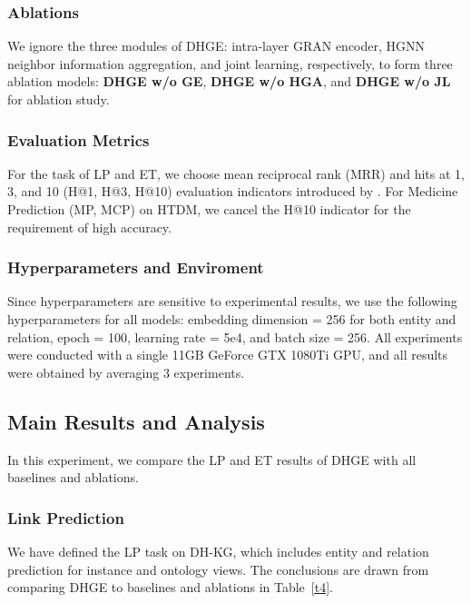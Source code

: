 \documentclass[letterpaper]{article} \usepackage{aaai23}  \usepackage{times}  \usepackage{helvet}  \usepackage{courier}  \usepackage[hyphens]{url}  \usepackage{graphicx} \urlstyle{rm} \def\UrlFont{\rm}  \usepackage{natbib}  \usepackage{caption} \frenchspacing  \setlength{\pdfpagewidth}{8.5in}  \setlength{\pdfpageheight}{11in}  \usepackage{times}
\begin{document}
\subsubsection{Ablations}
We ignore the three modules of DHGE: intra-layer GRAN encoder, HGNN neighbor information aggregation, and joint learning, respectively, to form three ablation models: \textbf{DHGE w/o GE}, \textbf{DHGE w/o HGA}, and  \textbf{DHGE w/o JL} for ablation study.

\subsubsection{Evaluation Metrics}
For the task of LP and ET, we choose mean reciprocal rank (MRR) and hits at 1, 3, and 10 (H@1, H@3, H@10) evaluation indicators introduced by \citet{TransE}. For Medicine Prediction (MP, MCP) on HTDM, we cancel the H@10 indicator for the requirement of high accuracy.

\subsubsection{Hyperparameters and Enviroment}
Since hyperparameters are sensitive to experimental results, we use the following hyperparameters for all models: embedding dimension = 256 for both entity and relation, epoch = 100, learning rate = 5e4, and batch size = 256. All experiments were conducted with a single 11GB GeForce GTX 1080Ti GPU, and all results were obtained by averaging 3 experiments.

\subsection{Main Results and Analysis}
\label{6.2}
In this experiment, we compare the LP and ET results of DHGE with all baselines and ablations. 

\subsubsection{Link Prediction}
We have defined the LP task on DH-KG, which includes entity and relation prediction for instance and ontology views. The conclusions are drawn from comparing DHGE to baselines and ablations in Table~\ref{t4}.
\end{document}
